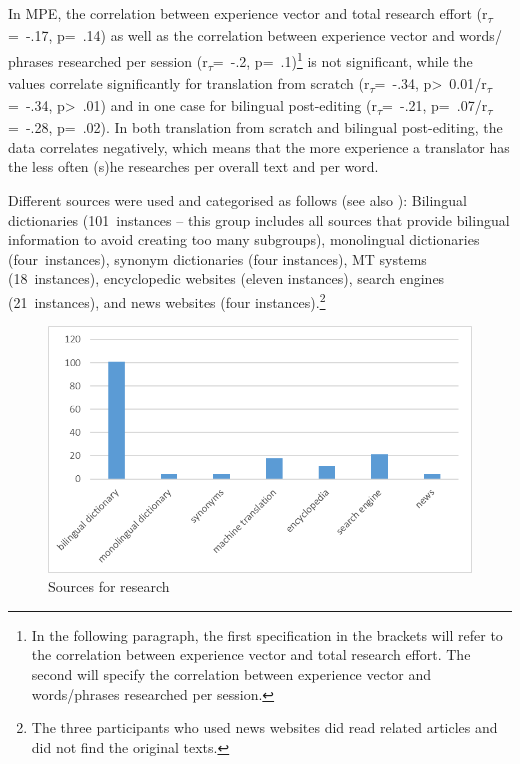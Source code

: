 \documentclass[output=paper]{langsci/langscibook}
\begin{document}
In MPE, the correlation between experience vector and total research effort (r\textsubscript{$\tau $}=~-.17,\textsubscript{ }p=~.14) as well as the correlation between experience vector and words/ phrases researched per session (r\textsubscript{$\tau $}=~-.2,\textsubscript{ }p=~.1)\footnote{In the following paragraph, the first specification in the brackets will refer to the correlation between experience vector and total research effort. The second will specify the correlation between experience vector and words/phrases researched per session.} is not significant, while the values correlate significantly for translation from scratch (r\textsubscript{$\tau $}=~-.34, p{\textgreater}~0.01/r\textsubscript{$\tau $}=~-.34, p{\textgreater}~.01) and in one case for bilingual post-editing (r\textsubscript{$\tau $}=~-.21, p=~.07/r\textsubscript{$\tau $}=~-.28, p=~.02). In both translation from scratch and bilingual post-editing, the data correlates negatively, which means that the more experience a translator has the less often (s)he researches per overall text and per word. 



Different sources were used and categorised as follows (see also ): Bilingual dictionaries (101~instances -- this group includes all sources that provide bilingual information to avoid creating too many subgroups), monolingual dictionaries (four~instances), synonym dictionaries (four instances), MT systems (18~instances), encyclopedic websites (eleven instances), search engines (21~instances), and news websites (four instances).\footnote{The three participants who used news websites did read related articles and did not find the original texts.}


 
\begin{figure}[h]
 \includegraphics[width=\textwidth]{figures/Nitzke1.png}
 \caption{Sources for research}
 \label{nitzke:fig:1}
\end{figure} 
\end{document}

